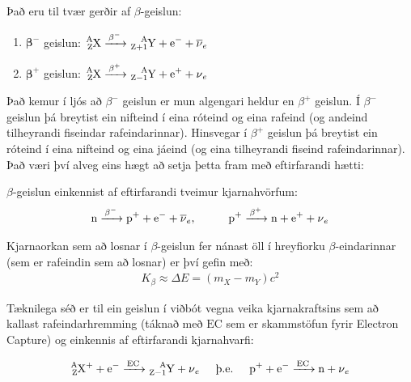\ifdefined \wholebook \else\documentclass[oneside]{book}\usepackage{EdlBook}\graphicspath{{figures/}}
\begin{document}
\begin{tcolorbox}
\begin{definition}
Það eru til tvær gerðir af $\beta$-geislun:
\begin{enumerate}[label = \textbf{(\roman*)}]
    \item $\boldsymbol{\beta^-}$ geislun: \hspace{0.4cm} $\ce{^{A}_{Z}X ->[\beta^-] ^{A}_{Z+1}Y + e^{-} + \overline{\nu}_e}$
    \item $\boldsymbol{\beta^+}$ geislun: \hspace{0.4cm} $\ce{^{A}_{Z}X ->[\beta^+] ^{A}_{Z-1}Y + e^{+} + \nu_e}$
\end{enumerate}
\end{definition}
\end{tcolorbox}

Það kemur í ljós að $\beta^-$ geislun er mun algengari heldur en $\beta^+$ geislun. Í $\beta^-$ geislun þá breytist ein nifteind í eina róteind og eina rafeind (og andeind tilheyrandi fiseindar rafeindarinnar). Hinsvegar í $\beta^+$ geislun þá breytist ein róteind í eina nifteind og eina jáeind (og eina tilheyrandi fiseind rafeindarinnar). Það væri því alveg eins hægt að setja þetta fram með eftirfarandi hætti:

\begin{tcolorbox}
$\beta$-geislun einkennist af eftirfarandi tveimur kjarnahvörfum:
\begin{align*}
\ce{n ->[\beta^-] p^+ + e^- + \overline{\nu}_e}, \hspace{1cm} \ce{p^+ ->[\beta^+] n + e^+ + \nu_e}
\end{align*}
\end{tcolorbox}

Kjarnaorkan sem að losnar í $\beta$-geislun fer nánast öll í hreyfiorku $\beta$-eindarinnar (sem er rafeindin sem að losnar) er því gefin með:
\begin{align*}
    K_\beta \approx \Delta E = \left( m_X - m_Y \right)c^2
\end{align*}

Tæknilega séð er til ein geislun í viðbót vegna veika kjarnakraftsins sem að kallast rafeindarhremming (táknað með $\text{EC}$ sem er skammstöfun fyrir Electron Capture) og einkennis af eftirfarandi kjarnahvarfi:
\begin{tcolorbox}
\begin{align*}
\ce{^{A}_{Z}X+ + e^- ->[\text{EC}] ^{A}_{Z-1}Y + \nu_e } \hspace{0.5cm} \text{þ.e.} \hspace{0.5cm} \ce{p^+ + e^- ->[\text{EC}] n + \nu_e }
\end{align*}
\end{tcolorbox}
\end{document}
